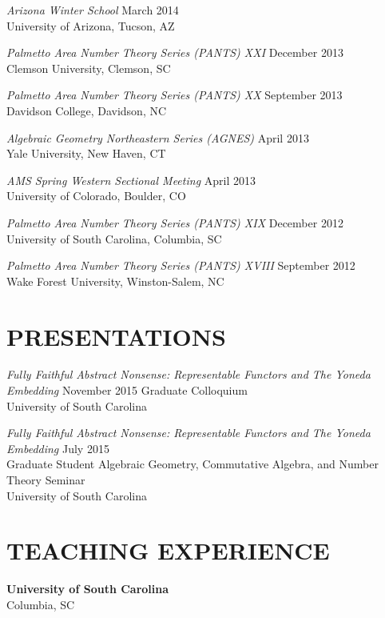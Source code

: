 \documentclass[line,overlapped]{res}
\begin{document}
\begin{resume}
                          {\sl Arizona Winter School} \hfill March 2014\\
                          University of Arizona, Tucson, AZ

                          {\sl Palmetto Area Number Theory Series (PANTS) XXI} \hfill December 2013\\
                          Clemson University, Clemson, SC

                          {\sl Palmetto Area Number Theory Series (PANTS) XX} \hfill September 2013\\
                          Davidson College, Davidson, NC

                          {\sl Algebraic Geometry Northeastern Series (AGNES)} \hfill April 2013\\
                          Yale University, New Haven, CT

                          {\sl AMS Spring Western Sectional Meeting} \hfill April 2013\\
                          University of Colorado, Boulder, CO

                          {\sl Palmetto Area Number Theory Series (PANTS) XIX} \hfill December 2012\\
                          University of South Carolina, Columbia, SC

                          {\sl Palmetto Area Number Theory Series (PANTS) XVIII} \hfill September 2012\\
                          Wake Forest University, Winston-Salem, NC

                          \section{PRESENTATIONS}
                          {\sl Fully Faithful Abstract Nonsense: Representable Functors and The Yoneda Embedding} \hfill November 2015
                          Graduate Colloquium\\
                          University of South Carolina

                          {\sl Fully Faithful Abstract Nonsense: Representable Functors and The Yoneda Embedding} \hfill July 2015\\
                          Graduate Student Algebraic Geometry, Commutative Algebra, and Number Theory Seminar\\
                          University of South Carolina
                          \section{TEACHING EXPERIENCE}
                          {\bf University of South Carolina}\\Columbia, SC
                          

\end{resume}
\end{document}
